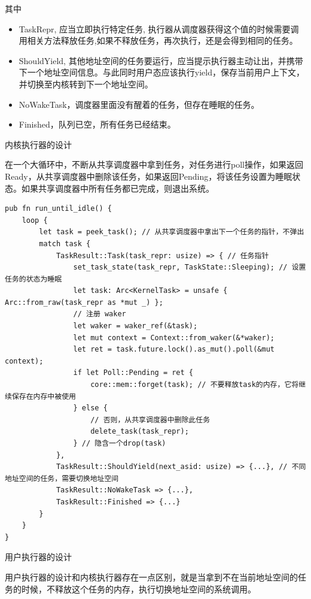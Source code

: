 其中

\begin{itemize}
    \item TaskRepr, 应当立即执行特定任务, 执行器从调度器获得这个值的时候需要调用相关方法释放任务,如果不释放任务，再次执行，还是会得到相同的任务。
    \item ShouldYield, 其他地址空间的任务要运行，应当提示执行器主动让出，并携带下一个地址空间信息。与此同时用户态应该执行yield，保存当前用户上下文，并切换至内核转到下一个地址空间。
    \item  NoWakeTask，调度器里面没有醒着的任务，但存在睡眠的任务。
    \item  Finished，队列已空，所有任务已经结束。
\end{itemize}


内核执行器的设计

在一个大循环中，不断从共享调度器中拿到任务，对任务进行poll操作，如果返回Ready，从共享调度器中删除该任务，如果返回Pending，将该任务设置为睡眠状态。如果共享调度器中所有任务都已完成，则退出系统。

\begin{lstlisting}[caption=内核执行器的设计]
pub fn run_until_idle() {
    loop {
        let task = peek_task(); // 从共享调度器中拿出下一个任务的指针，不弹出
        match task {
            TaskResult::Task(task_repr: usize) => { // 任务指针
                set_task_state(task_repr, TaskState::Sleeping); // 设置任务的状态为睡眠
                let task: Arc<KernelTask> = unsafe { Arc::from_raw(task_repr as *mut _) };
                // 注册 waker
                let waker = waker_ref(&task);
                let mut context = Context::from_waker(&*waker);
                let ret = task.future.lock().as_mut().poll(&mut context);
                if let Poll::Pending = ret {
                    core::mem::forget(task); // 不要释放task的内存，它将继续保存在内存中被使用
                } else {
                    // 否则，从共享调度器中删除此任务
                    delete_task(task_repr);
                } // 隐含一个drop(task)
            },
            TaskResult::ShouldYield(next_asid: usize) => {...}, // 不同地址空间的任务，需要切换地址空间
            TaskResult::NoWakeTask => {...},
            TaskResult::Finished => {...}
        }
    }
}
\end{lstlisting}

用户执行器的设计

用户执行器的设计和内核执行器存在一点区别，就是当拿到不在当前地址空间的任务的时候，不释放这个任务的内存，执行切换地址空间的系统调用。

